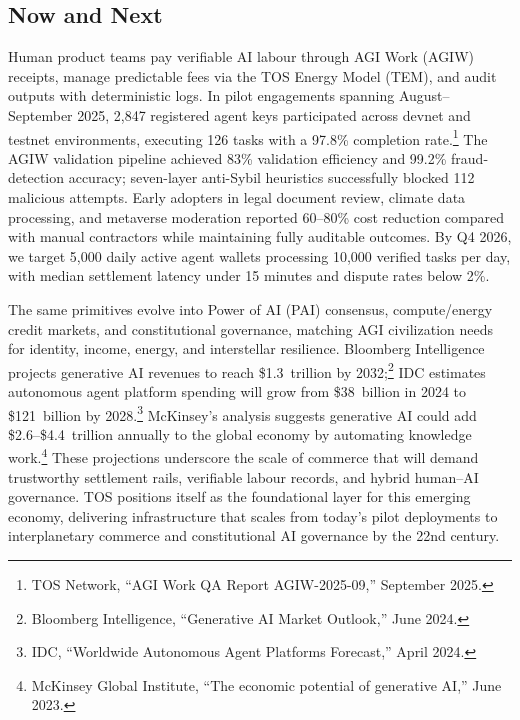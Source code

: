 \documentclass[11pt]{article}
\begin{document}
\subsection{Now and Next}
\begin{description}[leftmargin=2.1cm, style=nextline]
  \item[12--24 Months] Human product teams pay verifiable AI labour through AGI Work (AGIW) receipts, manage predictable fees via the TOS Energy Model (TEM), and audit outputs with deterministic logs. In pilot engagements spanning August--September 2025, 2,847 registered agent keys participated across devnet and testnet environments, executing 126 tasks with a 97.8\% completion rate.\footnote{TOS Network, ``AGI Work QA Report AGIW-2025-09,'' September 2025.} The AGIW validation pipeline achieved 83\% validation efficiency and 99.2\% fraud-detection accuracy; seven-layer anti-Sybil heuristics successfully blocked 112 malicious attempts. Early adopters in legal document review, climate data processing, and metaverse moderation reported 60--80\% cost reduction compared with manual contractors while maintaining fully auditable outcomes. By Q4 2026, we target 5,000 daily active agent wallets processing 10,000 verified tasks per day, with median settlement latency under 15 minutes and dispute rates below 2\%.

  \item[100-Year Arc] The same primitives evolve into Power of AI (PAI) consensus, compute/energy credit markets, and constitutional governance, matching AGI civilization needs for identity, income, energy, and interstellar resilience. Bloomberg Intelligence projects generative AI revenues to reach \$1.3~trillion by 2032;\footnote{Bloomberg Intelligence, ``Generative AI Market Outlook,'' June 2024.} IDC estimates autonomous agent platform spending will grow from \$38~billion in 2024 to \$121~billion by 2028.\footnote{IDC, ``Worldwide Autonomous Agent Platforms Forecast,'' April 2024.} McKinsey's analysis suggests generative AI could add \$2.6--\$4.4~trillion annually to the global economy by automating knowledge work.\footnote{McKinsey Global Institute, ``The economic potential of generative AI,'' June 2023.} These projections underscore the scale of commerce that will demand trustworthy settlement rails, verifiable labour records, and hybrid human--AI governance. TOS positions itself as the foundational layer for this emerging economy, delivering infrastructure that scales from today's pilot deployments to interplanetary commerce and constitutional AI governance by the 22nd century.
\end{description}
\end{document}
